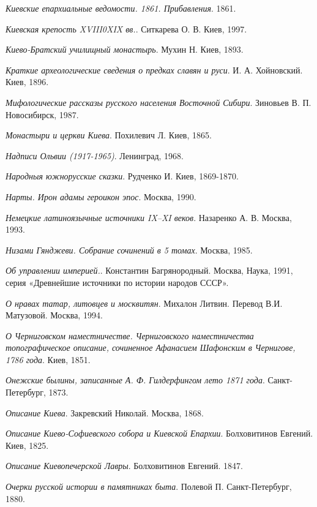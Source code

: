 \emph{Киевские епархиальные ведомости. 1861. Прибавления}. 1861.

\emph{Киевская крепость XVIII0XIX вв.}. Ситкарева О. В. Киев, 1997.

\emph{Киево-Братский училищный монастырь}. Мухин Н. Киев, 1893.

\emph{Краткие археологические сведения о предках славян и руси}. И. А. Хойновский. Киев, 1896.

\emph{Мифологические рассказы русского населения Восточной Сибири}. Зиновьев В. П. Новосибирск, 1987.

\emph{Монастыри и церкви Киева}. Похилевич Л. Киев, 1865.

\emph{Надписи Ольвии (1917-1965)}. Ленинград, 1968. 

\emph{Народныя южнорусские сказки}. Рудченко И. Киев, 1869-1870.

\emph{Нарты. Ирон адамы героикон эпос}. Москва, 1990.

\emph{Немецкие латиноязычные источники IX–XI веков}. Назаренко А. В. Москва, 1993.

\emph{Низами Гянджеви. Собрание сочинений в 5 томах}. Москва, 1985.

\emph{Об управлении империей.}. Константин Багрянородный. Москва, Наука, 1991, серия «Древнейшие источники по истории народов СССР».

\emph{О нравах татар, литовцев и москвитян}. Михалон Литвин. Перевод В.И. Матузовой. Москва, 1994.

\emph{О Черниговском наместничестве. Черниговского наместничества топографическое описание, сочиненное Афанасием Шафонским в Чернигове, 1786 года}. Киев, 1851.

\emph{Онежские былины, записанные А. Ф. Гилдерфингом лето 1871 года}. Санкт-Петербург, 1873.

\emph{Описание Киева}. Закревский Николай. Москва, 1868.

\emph{Описание Киево-Софиевского собора и Киевской Епархии}. Болховитинов Евгений. Киев, 1825.

\emph{Описание Киевопечерской Лавры}. Болховитинов Евгений. 1847.

\emph{Очерки русской истории в памятниках быта}. Полевой П. Санкт-Петербург, 1880.


